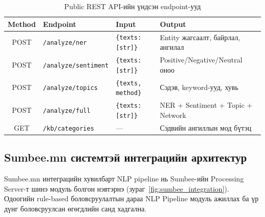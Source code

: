 \begin{table}[h!]
\centering
\renewcommand{\arraystretch}{1.4}
\begin{tabular}{|c|l|p{3.5cm}|p{4.5cm}|}
\hline
\textbf{Method} & \textbf{Endpoint} & \textbf{Input} & \textbf{Output} \\ \hline
POST & \texttt{/analyze/ner} & \texttt{\{texts: [str]\}} & Entity жагсаалт, байрлал, ангилал \\ \hline
POST & \texttt{/analyze/sentiment} & \texttt{\{texts: [str]\}} & Positive/Negative/Neutral оноо \\ \hline
POST & \texttt{/analyze/topics} & \texttt{\{texts, method\}} & Сэдэв, keyword-ууд, хувь \\ \hline
POST & \texttt{/analyze/full} & \texttt{\{texts: [str]\}} & NER + Sentiment + Topic + Network \\ \hline
GET  & \texttt{/kb/categories} & --- & Сэдвийн ангиллын мод бүтэц \\ \hline
\end{tabular}
\caption{Public REST API-ийн үндсэн endpoint-ууд}
\label{tab:api_endpoints}
\end{table}

\subsection{Sumbee.mn системтэй интеграцийн архитектур}

Sumbee.mn интеграцийн хувилбарт NLP pipeline нь Sumbee-ийн Processing Server-т шинэ модуль болгон нэвтэрнэ (зураг~\ref{fig:sumbee_integration}). Одоогийн rule-based боловсруулалтын дараа NLP Pipeline модуль ажиллах ба үр дүнг боловсруулсан өгөгдлийн санд хадгална.

